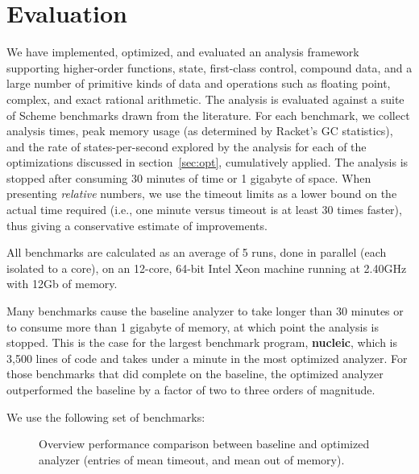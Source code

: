 \documentclass[9pt]{sigplanconf} %
\begin{document}
\section{Evaluation}
\label{sec:eval}

We have implemented, optimized, and evaluated an analysis framework supporting higher-order functions, state, first-class control, compound data, and a large number of primitive kinds of data and operations such as floating point, complex, and exact rational arithmetic.
%
The analysis is evaluated against a suite of Scheme benchmarks drawn from the literature.
%
For each benchmark, we collect analysis times, peak memory usage (as determined by Racket's GC statistics), and the rate of states-per-second explored by the analysis for each of the optimizations discussed in section~\ref{sec:opt}, cumulatively applied.
%
The analysis is stopped after consuming 30 minutes of time or 1 gigabyte of space.
%
When presenting \emph{relative} numbers, we use the timeout limits as a lower bound on the actual time required (i.e., one minute versus timeout is at least 30 times faster),
thus giving a conservative estimate of improvements.

All benchmarks are calculated as an average of 5 runs, done in
parallel (each isolated to a core), on an 12-core, 64-bit Intel Xeon machine running at 2.40GHz
with 12Gb of memory.

Many benchmarks cause the baseline analyzer to take longer than 30 minutes or to consume more than 1 gigabyte of memory, at which point the analysis is stopped.
%
This is the case for the largest benchmark program, {\bf nucleic}, which is 3,500 lines of code and takes under a minute in the most optimized analyzer.
%
For those benchmarks that did complete on the baseline, the optimized analyzer outperformed the baseline by a factor of two to three orders of magnitude.

We use the following set of benchmarks:
\begin{figure}
\centering

\caption{Overview performance comparison between baseline and
  optimized analyzer (entries of  mean timeout, and  mean out of memory).}
\label{fig:bench-overview}
\end{figure}
\end{document}

